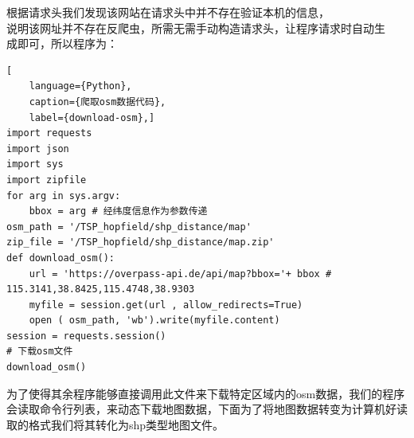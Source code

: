 根据请求头我们发现该网站在请求头中并不存在验证本机的信息，\\
说明该网址并不存在反爬虫，所需无需手动构造请求头，让程序请求时自动生\\
成即可，所以程序为：
\newline
\begin{lstlisting}[
    language={Python},
    caption={爬取osm数据代码},
    label={download-osm},]
import requests
import json
import sys
import zipfile
for arg in sys.argv:
    bbox = arg # 经纬度信息作为参数传递
osm_path = '/TSP_hopfield/shp_distance/map'
zip_file = '/TSP_hopfield/shp_distance/map.zip'
def download_osm():
    url = 'https://overpass-api.de/api/map?bbox='+ bbox # 115.3141,38.8425,115.4748,38.9303
    myfile = session.get(url , allow_redirects=True)
    open ( osm_path, 'wb').write(myfile.content)
session = requests.session()
# 下载osm文件
download_osm()
\end{lstlisting}
为了使得其余程序能够直接调用此文件来下载特定区域内的osm数据，我们的程序会读取命令行列表，来动态下载地图数据，下面为了将地图数据转变为计算机好读取的格式我们将其转化为shp类型地图文件。
